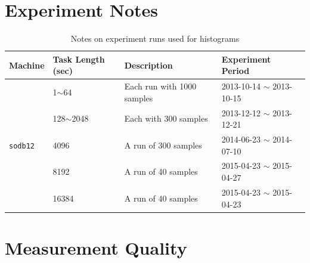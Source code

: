 \documentclass[10pt]{article}
\begin{document}
\section{Experiment Notes}
\begin{table}[h]
\begin{center}
\begin{tabular}{|l|p{3cm}||p{5cm}|p{4cm}|} \hline
Machine & Task Length (sec) & Description & Experiment Period\\ \hline
\multirow{5}{*}{{\tt sodb12}}  & 1$\sim$64 & Each run with 1000 samples & 2013-10-14 $\sim$ 2013-10-15\\ \cline{2-4}
& 128$\sim$2048 & Each with 300 samples & 2013-12-12 $\sim$ 2013-12-21\\ \cline{2-4}
& 4096 & A run of 300 samples & 2014-06-23 $\sim$ 2014-07-10 \\ \cline{2-4}
& 8192 & A run of 40 samples & 2015-04-23 $\sim$ 2015-04-27 \\ \cline{2-4}
& 16384 & A run of 40 samples& 2015-04-23 $\sim$ 2015-04-23 \\ \hline
\end{tabular}
\end{center}
\vspace{-.2in}
\caption{Notes on experiment runs used for histograms\label{tab:exp_notes1}}
\end{table}


\section{Measurement Quality~\label{sec:meq}}
\end{document}
